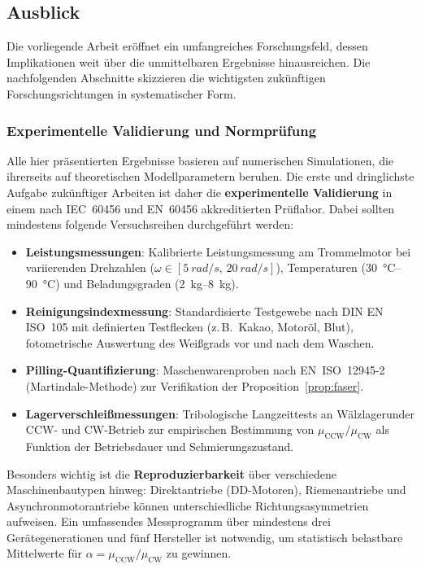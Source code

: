 ﻿\documentclass[12pt,a4paper]{article}
\theoremstyle{remark}
\newcommand{\CCW}{\mathrm{CCW}}
\newcommand{\CW}{\mathrm{CW}}
\begin{document}
	\subsection{Ausblick}
	
	Die vorliegende Arbeit eröffnet ein umfangreiches Forschungsfeld, dessen Implikationen
	weit über die unmittelbaren Ergebnisse hinausreichen. Die nachfolgenden Abschnitte
	skizzieren die wichtigsten zukünftigen Forschungsrichtungen in systematischer Form.
	
	\subsubsection{Experimentelle Validierung und Normprüfung}
	
	Alle hier präsentierten Ergebnisse basieren auf numerischen Simulationen, die ihrerseits
	auf theoretischen Modellparametern beruhen. Die erste und dringlichste Aufgabe
	zukünftiger Arbeiten ist daher die \textbf{experimentelle Validierung} in einem nach
	IEC~60456 und EN~60456 akkreditierten Prüflabor. Dabei sollten mindestens folgende
	Versuchsreihen durchgeführt werden:
	
	\begin{itemize}
		\item \textbf{Leistungsmessungen}: Kalibrierte Leistungsmessung am Trommelmotor bei
		variierenden Drehzahlen ($\omega \in [\SI{5}{rad/s},\,\SI{20}{rad/s}]$), Temperaturen
		(\SI{30}{\celsius}--\SI{90}{\celsius}) und Beladungsgraden (\SI{2}{kg}--\SI{8}{kg}).
		\item \textbf{Reinigungsindexmessung}: Standardisierte Testgewebe nach DIN EN ISO~105
		mit definierten Testflecken (z.\,B.\ Kakao, Motoröl, Blut), fotometrische Auswertung
		des Weißgrads vor und nach dem Waschen.
		\item \textbf{Pilling-Quantifizierung}: Maschenwarenproben nach EN~ISO~12945-2
		(Martindale-Methode) zur Verifikation der Proposition~\ref{prop:faser}.
		\item \textbf{Lagerverschleißmessungen}: Tribologische Langzeittests an Wälzlager\-under
		CCW- und CW-Betrieb zur empirischen Bestimmung von $\mu_{\CCW}/\mu_{\CW}$ als
		Funktion der Betriebsdauer und Schmierungszustand.
	\end{itemize}
	
	Besonders wichtig ist die \textbf{Reproduzierbarkeit} über verschiedene
	Maschinenbautypen hinweg: Direktantriebe (DD-Motoren), Riemenantriebe und
	Asynchronmotorantriebe können unterschiedliche Richtungsasymmetrien aufweisen.
	Ein umfassendes Messprogramm über mindestens drei Gerätegenerationen und fünf
	Hersteller ist notwendig, um statistisch belastbare Mittelwerte für $\alpha = \mu_{\CCW}/\mu_{\CW}$
	zu gewinnen.
	
\end{document}

